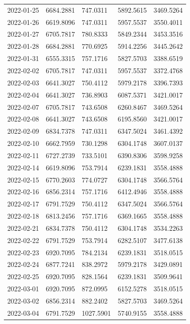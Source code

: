 {\begin{longtable}{lllll}
2022-01-25 & 6684.2881 & 747.0311 & 5892.5615 & 3469.5264 \\
2022-01-26 & 6619.8096 & 747.0311 & 5957.5537 & 3550.4011 \\
2022-01-27 & 6705.7817 & 780.8333 & 5849.2344 & 3453.3516 \\
2022-01-28 & 6684.2881 & 770.6925 & 5914.2256 & 3445.2642 \\
2022-01-31 & 6555.3315 & 757.1716 & 5827.5703 & 3388.6519 \\
2022-02-02 & 6705.7817 & 747.0311 & 5957.5537 & 3372.4768 \\
2022-02-03 & 6641.3027 & 750.4112 & 5979.2178 & 3396.7393 \\
2022-02-04 & 6641.3027 & 736.8903 & 6087.5371 & 3421.0017 \\
2022-02-07 & 6705.7817 & 743.6508 & 6260.8467 & 3469.5264 \\
2022-02-08 & 6641.3027 & 743.6508 & 6195.8560 & 3421.0017 \\
2022-02-09 & 6834.7378 & 747.0311 & 6347.5024 & 3461.4392 \\
2022-02-10 & 6662.7959 & 730.1298 & 6304.1748 & 3607.0137 \\
2022-02-11 & 6727.2739 & 733.5101 & 6390.8306 & 3598.9258 \\
2022-02-14 & 6619.8096 & 753.7914 & 6239.1831 & 3558.4888 \\
2022-02-15 & 6770.2603 & 774.0727 & 6304.1748 & 3566.5764 \\
2022-02-16 & 6856.2314 & 757.1716 & 6412.4946 & 3558.4888 \\
2022-02-17 & 6791.7529 & 750.4112 & 6347.5024 & 3566.5764 \\
2022-02-18 & 6813.2456 & 757.1716 & 6369.1665 & 3558.4888 \\
2022-02-21 & 6834.7378 & 750.4112 & 6304.1748 & 3534.2263 \\
2022-02-22 & 6791.7529 & 753.7914 & 6282.5107 & 3477.6138 \\
2022-02-23 & 6920.7095 & 784.2134 & 6239.1831 & 3518.0515 \\
2022-02-24 & 6877.7241 & 838.2972 & 5979.2178 & 3429.0891 \\
2022-02-25 & 6920.7095 & 828.1564 & 6239.1831 & 3509.9641 \\
2022-03-01 & 6920.7095 & 872.0995 & 6152.5278 & 3518.0515 \\
2022-03-02 & 6856.2314 & 882.2402 & 5827.5703 & 3469.5264 \\
2022-03-04 & 6791.7529 & 1027.5901 & 5740.9155 & 3558.4888 \\

\end{longtable}}
